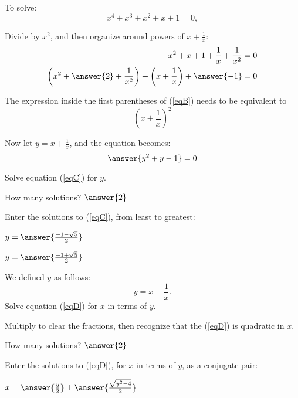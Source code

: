\documentclass[space,nooutcomes]{ximera}
\begin{document}
\begin{problem}

To solve: 
\begin{equation}
x^4+x^3+x^2+x+1=0,
\end{equation}

Divide by $x^2$, and then organize around powers of $x + \frac{1}{x}$: 
\begin{align}
x^2+x+1+\frac{1}{x}+\frac{1}{x^2}&=0 \\
\left(x^2+ \answer{2} + \frac{1}{x^2}\right)+ \left(x+\frac{1}{x}\right)+\answer{-1}&=0 \label{eqB}
\end{align}
\begin{hint}
The expression inside the first parentheses of (\ref{eqB}) needs to be equivalent to 
\[
\left(x+\frac{1}{x}\right)^2
\]
\end{hint}
\begin{problem}
Now let $y = x + \frac{1}{x}$, and the equation becomes: 
\begin{equation} \label{eqC}
\answer{y^2+y-1}=0
\end{equation}

Solve equation (\ref{eqC}) for $y$.

How many solutions?  $\answer{2}$ 

\begin{problem}
Enter the solutions to (\ref{eqC}), from least to greatest: 

\begin{prompt}
$y = \answer{\frac{-1-\sqrt{5}}{2}}$

$y = \answer{\frac{-1+\sqrt{5}}{2}}$
\end{prompt}

\end{problem}
\end{problem}
\end{problem}

\begin{problem}
We defined $y$ as follows: 
\begin{equation} \label{eqD}
y = x + \frac{1}{x}.  
\end{equation}
Solve equation (\ref{eqD}) for $x$ in terms of $y$.  
\begin{hint}
Multiply to clear the fractions, then recognize that the (\ref{eqD}) is quadratic in $x$.  
\end{hint}

How many solutions?  $\answer{2}$ 
\begin{problem}
\begin{prompt}
Enter the solutions to (\ref{eqD}), for $x$ in terms of $y$, as a conjugate pair: 

$x = \answer{\frac{y}{2}} \pm \answer{\frac{\sqrt{y^2-4}}{2}}$

\end{prompt}

\end{problem}
\end{problem}
\end{document}

